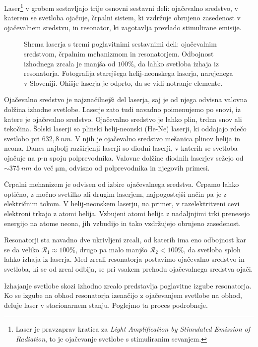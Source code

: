 Laser\footnote{Laser je pravzaprav kratica za {\it Light Amplification by Stimulated
Emission of Radiation}, to je ojačevanje svetlobe s stimuliranim sevanjem.} 
v grobem sestavljajo trije osnovni sestavni deli: ojačevalno sredstvo, 
v katerem se svetloba ojačuje, črpalni sistem, ki vzdržuje obrnjeno zasedenost
v ojačevalnem sredstvu, in resonator, ki zagotavlja prevlado stimulirane emisije.
\begin{figure}[h!]
\centering
\def\svgwidth{90truemm} 

\caption{Shema laserja s tremi poglavitnimi sestavnimi deli: ojačevalnim sredstvom, 
črpalnim mehanizmom in resonatorjem. Odbojnost izhodnega zrcala je manjša od $100\%$,
da lahko svetloba izhaja iz resonatorja. Fotografija starejšega helij-neonskega laserja, narejenega v Sloveniji. Ohišje laserja je odprto, da se vidi notranje elemente.
}
\label{fig:11_laser}
\end{figure}

Ojačevalno sredstvo je najznačilnejši del laserja, saj je od njega odvisna 
valovna dolžina izhodne svetlobe. Laserje zato tudi navadno poimenujemo
po snovi, iz katere je ojačevalno sredstvo.
Ojačevalno sredstvo je lahko plin, trdna snov ali tekočina.  
Šolski laserji so plinski helij-neonski (He-Ne) laserji, ki oddajajo 
rdečo svetlobo pri $632,8~\si{nm}$. V njih je ojačevalno sredstvo
mešanica plinov helija in neona. Danes najbolj razširjenji laserji so 
diodni laserji, v katerih se svetloba ojačuje na p-n spoju polprevodnika. 
Valovne dolžine diodnih laserjev sežejo od $\sim 375~\si{nm}$ do več 
$\si{\micro\meter}$, odvisno od polprevodnika in njegovih primesi.

Črpalni mehanizem je odvisen od izbire ojačevalnega sredstva. Črpamo lahko 
optično, z močno svetilko ali drugim laserjem, najpogostejši način pa je z
električnim tokom. V helij-neonskem laserju, na primer, v razelektritveni 
cevi elektroni trkajo z atomi helija. Vzbujeni atomi helija z nadaljnjimi
trki prenesejo energijo na atome neona, jih vzbudijo in tako vzdržujejo 
obrnjeno zasedenost.

Resonatorji sta navadno dve ukrivljeni zrcali, od katerih ima eno odbojnost
kar se da veliko $\mathcal{R}_1 \approx 100\%$, drugo pa malo manjšo 
$\mathcal{R}_2 < 100\%$, da svetloba sploh lahko izhaja iz laserja. 
Med zrcali resonatorja postavimo ojačevalno sredstvo in svetloba, ki se od 
zrcal odbija, se pri vsakem prehodu ojačevalnega sredstva ojači.

Izhajanje svetlobe skozi izhodno zrcalo predstavlja poglavitne izgube 
resonatorja.  Ko se izgube na obhod resonatorja izenačijo z ojačevanjem 
svetlobe na obhod, deluje laser v stacionarnem stanju. Poglejmo ta proces 
podrobneje.

